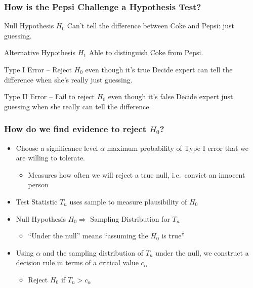 \documentclass[handout]{beamer}
\begin{document}
\begin{frame}
\begin{columns}
\begin{column}[l]{6cm}
\end{column} 
\end{columns} 

\end{frame}
\begin{frame}
\frametitle{How is the Pepsi Challenge a Hypothesis Test?}
	\begin{block}{Null Hypothesis $H_0$}
		Can't tell the difference between Coke and Pepsi: just guessing. \pause
\end{block}
	\begin{block}{Alternative Hypothesis $H_1$}
	Able to distinguish Coke from Pepsi.\pause
\end{block}
	\begin{block}{Type I Error -- Reject $H_0$ even though it's true} 
	Decide expert can tell the difference when she's really just guessing. \pause
\end{block}
	\begin{block}{Type II Error -- Fail to reject $H_0$ even though it's false}
	Decide expert just guessing when she really can tell the difference. 
\end{block}
\end{frame}
\begin{frame}
\frametitle{How do we find evidence to reject $H_0$?}
	\begin{itemize}
		\item Choose a \alert{significance level $\alpha$} maximum probability of Type I error that we are willing to tolerate. 
			\begin{itemize}
				\item Measures how often we will reject a true null, i.e.\ convict an innocent person \pause
			\end{itemize}
		\item Test Statistic $T_n$ uses sample to measure plausibility of $H_0$ \pause
		\item Null Hypothesis $H_0 \Rightarrow$ Sampling Distribution for $T_n$  
			\begin{itemize}
				\item ``Under the null'' means ``assuming the $H_0$ is true'' \pause
			\end{itemize}
		\item Using $\alpha$ and the sampling distribution of $T_n$ under the null, we construct a \alert{decision rule} in terms of a critical value $c_\alpha$ \pause
			\begin{itemize}
				\item Reject $H_0$ if $T_n > c_\alpha$
			\end{itemize}
	\end{itemize}
	
\end{frame}
\end{document}
